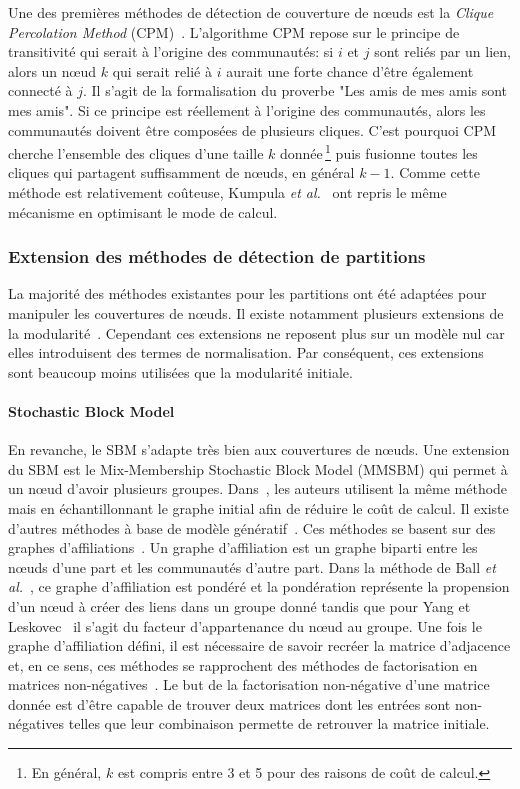 Une des premières méthodes de détection de couverture de n\oe{}uds est la \emph{Clique Percolation Method} (CPM)~\cite{Palla2005}.
L'algorithme CPM repose sur le principe de transitivité qui serait à l'origine des communautés: si $i$ et $j$ sont reliés par un lien, alors un n\oe{}ud $k$ qui serait relié à $i$ aurait une forte chance d'être également connecté à $j$.
Il s'agit de la formalisation du proverbe "Les amis de mes amis sont mes amis".
Si ce principe est réellement à l'origine des communautés, alors les communautés doivent être composées de plusieurs cliques.
C'est pourquoi CPM cherche l'ensemble des cliques d'une taille $k$ donnée\,\footnote{En général, $k$ est compris entre 3 et 5 pour des raisons de coût de calcul.} puis fusionne toutes les cliques qui partagent suffisamment de n\oe{}uds, en général $k-1$. 
Comme cette méthode est relativement coûteuse, Kumpula \emph{et al.}~\cite{Kumpula2008} ont repris le même mécanisme en optimisant le mode de calcul.

\subsubsection{Extension des méthodes de détection de partitions}

La majorité des méthodes existantes pour les partitions ont été adaptées pour manipuler les couvertures de n\oe{}uds.
Il existe notamment plusieurs extensions de la modularité~\cite{Shen2009,Nicosia2009}.
Cependant ces extensions ne reposent plus sur un modèle nul car elles introduisent des termes de normalisation.
Par conséquent, ces extensions sont beaucoup moins utilisées que la modularité initiale.

\paragraph{Stochastic Block Model}
En revanche, le SBM s'adapte très bien aux couvertures de n\oe{}uds.
Une extension du SBM est le Mix-Membership Stochastic Block Model (MMSBM)\cite{Airoldi2008} qui permet à un n\oe{}ud d'avoir plusieurs groupes.
Dans~\cite{Gopalan2013a}, les auteurs utilisent la même méthode mais en échantillonnant le graphe initial afin de réduire le coût de calcul.
Il existe d'autres méthodes à base de modèle génératif~\cite{Ball2011,Yang2013}.
Ces méthodes se basent sur des graphes d'affiliations~\cite{BreigerRonald1974}.
Un graphe d'affiliation est un graphe biparti entre les n\oe{}uds d'une part et les communautés d'autre part.
Dans la méthode de Ball \emph{et al.}~\cite{Ball2011}, ce graphe d'affiliation est pondéré et la pondération représente la propension d'un n\oe{}ud à créer des liens dans un groupe donné tandis que pour Yang et Leskovec~\cite{Yang2013} il s'agit du facteur d'appartenance du n\oe{}ud au groupe.
Une fois le graphe d'affiliation défini, il est nécessaire de savoir recréer la matrice d'adjacence et, en ce sens, ces méthodes se rapprochent des méthodes de factorisation en matrices non-négatives~\cite{Lee1999}.
Le but de la factorisation non-négative d'une matrice donnée est d'être capable de trouver deux matrices dont les entrées sont non-négatives telles que leur combinaison permette de retrouver la matrice initiale.

